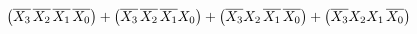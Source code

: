 \documentclass[preview]{standalone}
\begin{document}
\begin{align*}
\left(\overline{X_3}\hspace{0.05cm}\overline{X_2}\hspace{0.05cm}\overline{X_1}\hspace{0.05cm}\overline{X_0}\right)+\left(\overline{X_3}\hspace{0.05cm}\overline{X_2}\hspace{0.05cm}\overline{X_1}X_0\right)+\left(\overline{X_3}X_2\hspace{0.05cm}\overline{X_1}\hspace{0.05cm}\overline{X_0}\right)+\left(\overline{X_3}X_2X_1\hspace{0.05cm}\overline{X_0}\right)
\end{align*}
\end{document}
